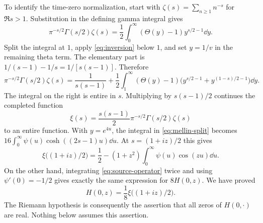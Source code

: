 To identify the time-zero normalization, start with
$\zeta(s)=\sum_{n\ge1}n^{-s}$ for $\Re s>1$. Substitution in the defining
gamma integral gives
\[
 \pi^{-s/2}\Gamma(s/2)\zeta(s)
 =\frac12\int_0^\infty (\Theta(y)-1)y^{s/2-1}\dd y.
\]
Split the integral at $1$, apply \eqref{eq:inversion} below $1$, and set
$y=1/v$ in the remaining theta term. The elementary part is
$1/(s-1)-1/s=1/[s(s-1)]$. Therefore
\begin{equation}\label{eq:mellin-split}
 \pi^{-s/2}\Gamma(s/2)\zeta(s)
 =\frac1{s(s-1)}+\frac12\int_1^\infty(\Theta(y)-1)
 \bigl(y^{s/2-1}+y^{(1-s)/2-1}\bigr)\dd y.
\end{equation}
The integral on the right is entire in $s$. Multiplying by $s(s-1)/2$
continues the completed function
\[
 \xi(s)=\frac{s(s-1)}2\pi^{-s/2}\Gamma(s/2)\zeta(s)
\]
to an entire function. With $y=e^{4u}$, the integral in
\eqref{eq:mellin-split} becomes
$16\int_0^\infty\psi(u)\cosh((2s-1)u)\dd u$. At
$s=(1+iz)/2$ this gives
\[
 \xi\bigl((1+iz)/2\bigr)
 =\frac12-(1+z^2)\int_0^\infty\psi(u)\cos(zu)\dd u.
\]
On the other hand, integrating \eqref{eq:source-operator} twice and using
$\psi'(0)=-1/2$ gives exactly the same expression for $8H(0,z)$.
We have proved
\begin{equation}\label{eq:xi}
 H(0,z)=\frac18\xi\bigl((1+iz)/2\bigr).
\end{equation}
The Riemann hypothesis is consequently the assertion that all zeros of
$H(0,\cdot)$ are real. Nothing below assumes this assertion.
